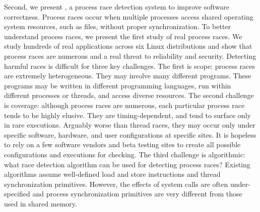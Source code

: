 Second, we present \racepro, a process race detection
system to improve software correctness. Process races occur when multiple
processes access shared operating system resources, such as files, without
proper synchronization.
To better understand process races, we present the first study of real process
races. We study hundreds of real applications across six Linux distributions and
show that process races are numerous and a real threat to reliability and
security. Detecting harmful races is difficult for three key challenges.
The first is scope: process races are extremely heterogeneous.  They may involve
many different programs.  These programs may be written in different programming
languages, run within different processes or threads, and access diverse
resources. The second challenge is coverage: although
process races are numerous, each particular process race tends to be highly
elusive.  They are timing-dependent, and tend to surface only in rare
executions. Arguably worse than thread races, they may occur only under
specific software, hardware, and user configurations at specific sites.  It is
hopeless to rely on a few software vendors and beta testing sites to create all
possible configurations and executions for checking.  The third challenge is
algorithmic: what race detection algorithm can be used for detecting process races?
Existing algorithms assume well-defined load and store instructions and thread
synchronization primitives. However, the effects of system calls are often
under-specified and process synchronization primitives are very different from
those used in shared memory.

